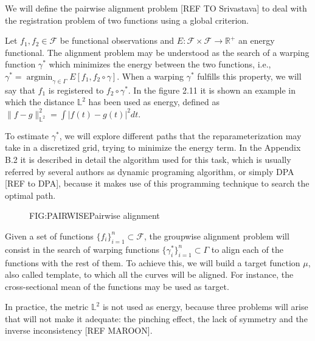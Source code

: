 
We will define the pairwise alignment problem [REF TO Srivastava] to deal with
the registration problem of two functions using a global criterion.

Let $f_1, f_2 \in \mathcal{F}$ be functional observations and
$E: \mathcal{F} \times \mathcal{F} \rightarrow \mathbb{R}^+$ an energy
functional. The alignment problem may be understood as the search of a warping
function $\gamma^*$ which minimizes the energy between the two functions, i.e.,
$\gamma^* = \operatorname{argmin}_{\gamma \in \Gamma} E[f_1, f_2 \circ \gamma]$.
When a warping $\gamma^*$ fulfills this property, we will say that $f_1$ is
registered to $f_2 \circ \gamma^*$. In the figure 2.11 it is shown an example in
 which the distance $\mathbb{L}^2$ has been used as energy, defined as
 $\|f - g\|_{\mathbb{L}^2}^2 = \int |f(t) - g(t)|^2 dt$.

To estimate $\gamma^*$, we will explore different paths that the
reparameterization may take in a discretized grid, trying to minimize the energy
term. In the Appendix B.2 it is described in detail the algorithm used for this
task, which is usually referred by several authors as dynamic programing
algorithm, or simply DPA [REF to DPA], because it makes use of this programming
technique to search the optimal path.

\begin{figure}[Pairwise alignment]{FIG:PAIRWISE}{Pairwise alignment}
   \quad
\end{figure}

Given a set of functions $\{f_i\}_{i=1}^n \subset \mathcal{F}$, the
groupwise alignment problem will consist in the search of warping functions
$\{\gamma_i^* \}_{i=1}^n \subset \Gamma$ to align each of the functions with the
rest of them. To achieve this, we will build a target function $\mu$, also
called template, to which all the curves will be aligned. For instance,
the cross-sectional mean of the functions may be used as target.

In practice, the metric $\mathbb{L}^2$ is not used as energy, because three
problems will arise that will not make it adequate: the pinching effect, the
lack of symmetry and the inverse inconsistency [REF MAROON].
